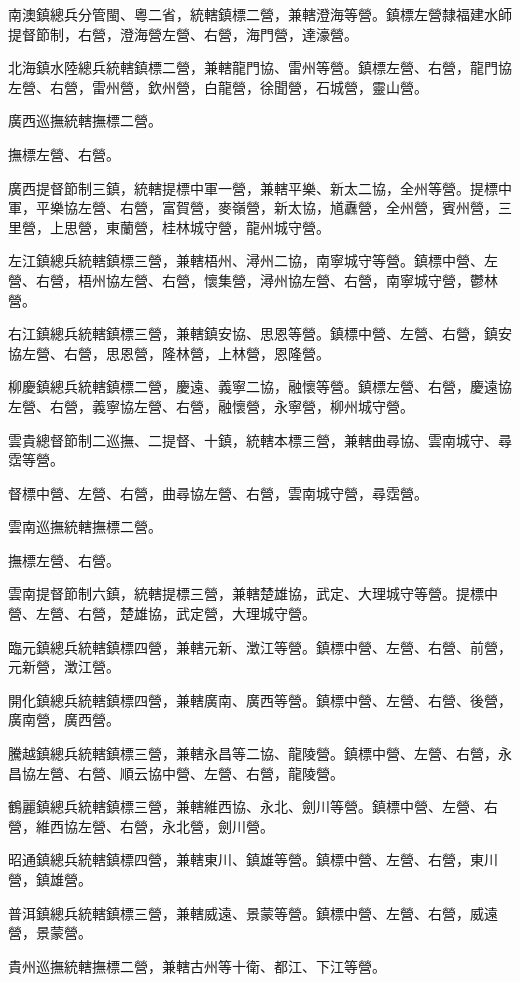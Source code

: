 \begin{pinyinscope}
南澳鎮總兵分管閩、粵二省，統轄鎮標二營，兼轄澄海等營。鎮標左營隸福建水師提督節制，右營，澄海營左營、右營，海門營，達濠營。

北海鎮水陸總兵統轄鎮標二營，兼轄龍門協、雷州等營。鎮標左營、右營，龍門協左營、右營，雷州營，欽州營，白龍營，徐聞營，石城營，靈山營。

廣西巡撫統轄撫標二營。

撫標左營、右營。

廣西提督節制三鎮，統轄提標中軍一營，兼轄平樂、新太二協，全州等營。提標中軍，平樂協左營、右營，富賀營，麥嶺營，新太協，馗纛營，全州營，賓州營，三里營，上思營，東蘭營，桂林城守營，龍州城守營。

左江鎮總兵統轄鎮標三營，兼轄梧州、潯州二協，南寧城守等營。鎮標中營、左營、右營，梧州協左營、右營，懷集營，潯州協左營、右營，南寧城守營，鬱林營。

右江鎮總兵統轄鎮標三營，兼轄鎮安協、思恩等營。鎮標中營、左營、右營，鎮安協左營、右營，思恩營，隆林營，上林營，恩隆營。

柳慶鎮總兵統轄鎮標二營，慶遠、義寧二協，融懷等營。鎮標左營、右營，慶遠協左營、右營，義寧協左營、右營，融懷營，永寧營，柳州城守營。

雲貴總督節制二巡撫、二提督、十鎮，統轄本標三營，兼轄曲尋協、雲南城守、尋霑等營。

督標中營、左營、右營，曲尋協左營、右營，雲南城守營，尋霑營。

雲南巡撫統轄撫標二營。

撫標左營、右營。

雲南提督節制六鎮，統轄提標三營，兼轄楚雄協，武定、大理城守等營。提標中營、左營、右營，楚雄協，武定營，大理城守營。

臨元鎮總兵統轄鎮標四營，兼轄元新、澂江等營。鎮標中營、左營、右營、前營，元新營，澂江營。

開化鎮總兵統轄鎮標四營，兼轄廣南、廣西等營。鎮標中營、左營、右營、後營，廣南營，廣西營。

騰越鎮總兵統轄鎮標三營，兼轄永昌等二協、龍陵營。鎮標中營、左營、右營，永昌協左營、右營、順云協中營、左營、右營，龍陵營。

鶴麗鎮總兵統轄鎮標三營，兼轄維西協、永北、劍川等營。鎮標中營、左營、右營，維西協左營、右營，永北營，劍川營。

昭通鎮總兵統轄鎮標四營，兼轄東川、鎮雄等營。鎮標中營、左營、右營，東川營，鎮雄營。

普洱鎮總兵統轄鎮標三營，兼轄威遠、景蒙等營。鎮標中營、左營、右營，威遠營，景蒙營。

貴州巡撫統轄撫標二營，兼轄古州等十衛、都江、下江等營。


\end{pinyinscope}
